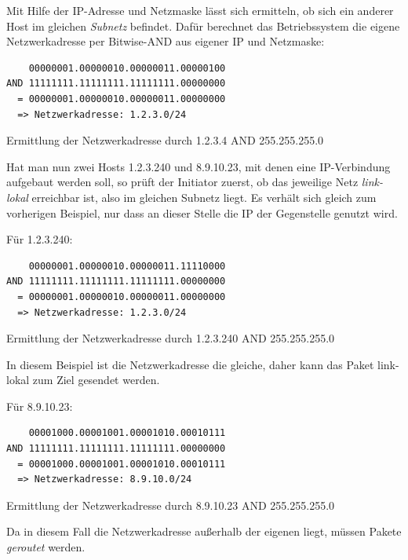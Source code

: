 Mit Hilfe der IP-Adresse und Netzmaske lässt sich ermitteln, ob sich ein anderer Host im gleichen \textit{Subnetz} befindet. Dafür berechnet das Betriebssystem die eigene Netzwerkadresse per Bitwise-AND aus eigener IP und Netzmaske:
\begin{listing}[h]
\begin{verbatim}
    00000001.00000010.00000011.00000100
AND 11111111.11111111.11111111.00000000
  = 00000001.00000010.00000011.00000000
  => Netzwerkadresse: 1.2.3.0/24
\end{verbatim}
\label{own-ip-address-AND-subnet}
\caption{Ermittlung der Netzwerkadresse durch 1.2.3.4 AND 255.255.255.0}
\end{listing}
Hat man nun zwei Hosts 1.2.3.240 und 8.9.10.23, mit denen eine IP-Verbindung aufgebaut werden soll, so prüft der Initiator zuerst, ob das jeweilige Netz \textit{link-lokal} erreichbar ist, also im gleichen Subnetz liegt. Es verhält sich gleich zum vorherigen Beispiel, nur dass an dieser Stelle die IP der Gegenstelle genutzt wird.

Für 1.2.3.240:

\begin{listing}[h]
\begin{verbatim}
    00000001.00000010.00000011.11110000
AND 11111111.11111111.11111111.00000000
  = 00000001.00000010.00000011.00000000
  => Netzwerkadresse: 1.2.3.0/24
\end{verbatim}
\label{local-ip-address-AND-subnet}
\caption{Ermittlung der Netzwerkadresse durch 1.2.3.240 AND 255.255.255.0}
\end{listing}\FloatBarrier
In diesem Beispiel ist die Netzwerkadresse die gleiche, daher kann das Paket link-lokal zum Ziel gesendet werden.

Für 8.9.10.23\label{ip_ausserhalb}:
\begin{listing}[h]
\begin{verbatim}
    00001000.00001001.00001010.00010111
AND 11111111.11111111.11111111.00000000
  = 00001000.00001001.00001010.00010111
  => Netzwerkadresse: 8.9.10.0/24
\end{verbatim}
\label{remote-ip-address-AND-subnet}
\caption{Ermittlung der Netzwerkadresse durch 8.9.10.23 AND 255.255.255.0}
\end{listing}\FloatBarrier
Da in diesem Fall die Netzwerkadresse außerhalb der eigenen liegt, müssen Pakete \textit{geroutet} werden.

